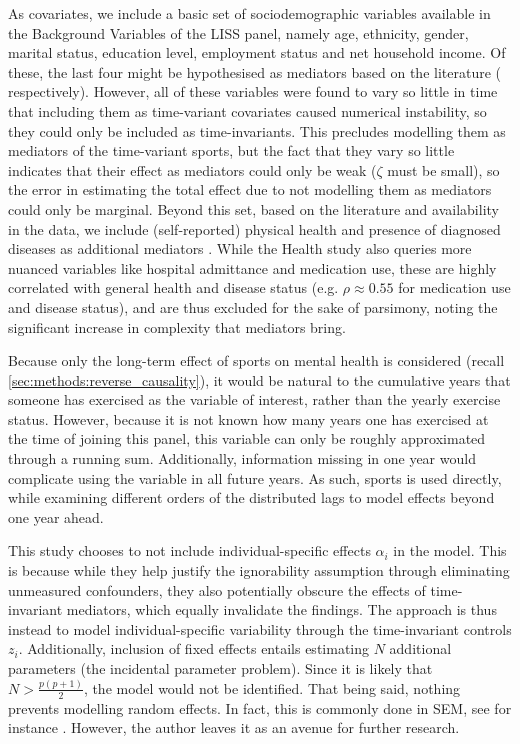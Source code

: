 As covariates, we include a basic set of sociodemographic variables available in the Background Variables of the LISS panel,
namely age, ethnicity, gender, marital status, education level, employment status and net household income.
Of these, the last four might be hypothesised as mediators based on the literature
( respectively).
However, all of these variables were found to vary so little in time that including them as time-variant covariates caused
numerical instability, so they could only be included as time-invariants. This precludes modelling them as mediators
of the time-variant sports,
but the fact that they vary so little indicates that their effect as mediators could only be weak ($\zeta$ must be small),
so the error in estimating the total effect due to not modelling them as mediators could only be marginal.
Beyond this set, based on the literature and availability in the data, we include (self-reported) physical health
and presence of diagnosed diseases as additional mediators \cite{westcott2012resistance}.
While the Health study also queries more nuanced variables like hospital admittance and medication use, these are
highly correlated with general health and disease status (e.g. $\rho \approx 0.55$ for medication use and disease status),
and are thus excluded for the sake of parsimony, noting the significant increase in complexity that mediators bring.

Because only the long-term effect of sports on mental health is considered (recall \cref{sec:methods:reverse_causality}),
it would be natural to the cumulative years that someone has exercised as the variable of interest, rather than the
yearly exercise status. However, because it is not known how many years one has exercised at the time of joining this panel,
this variable can only be roughly approximated through a running sum. Additionally, information missing in one year would
complicate using the variable in all future years.
As such, sports is used directly, while examining different orders of the distributed lags to model effects beyond
one year ahead.

This study chooses to not include individual-specific effects $\alpha_i$ in the model. This is because while they help justify
the ignorability assumption through eliminating unmeasured confounders, they also potentially obscure the effects of time-invariant mediators,
which equally invalidate the findings. The approach is thus instead to model individual-specific variability through the
time-invariant controls $z_i$. Additionally, inclusion of fixed effects entails estimating $N$ additional parameters
(the incidental parameter problem). Since it is likely that $N > \frac{p(p + 1)}{2}$, the model would not be identified.
That being said, nothing prevents modelling random effects. In fact, this is commonly done in
SEM, see for instance . However, the author leaves it as an avenue for further research.

